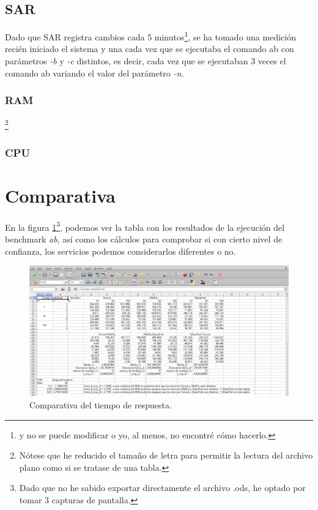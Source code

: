 \documentclass[a4paper, 10pt]{article}
\begin{document}
	\subsection{SAR}
		Dado que SAR registra cambios cada 5 minutos\footnote{y no se puede modificar o yo, al menos,
		no encontré cómo hacerlo.}, se ha tomado una medición recién iniciado el sistema y una cada
		vez que se ejecutaba el comando ab con parámetros \textit{-b} y \textit{-c} distintos, es decir,
		cada vez que se ejecutaban 3 veces el comando ab variando el valor del parámetro \textit{-n}.
	
		\subsubsection{RAM}\footnote{Nótese que he reducido el tamaño de letra para permitir la lectura
		del archivo plano como si se tratase de una tabla.}
			\lstset{basicstyle=\scriptsize}
			
	
		\subsubsection{CPU}
			\lstset{basicstyle=\footnotesize}
			


\section{Comparativa}
	En la figura \ref{fig:Comp_t}\footnote{Dado que no he sabido exportar directamente el archivo .ods,
	he optado por tomar 3 capturas de pantalla.}, podemos ver la tabla con los resultados de la ejecución
	del benchmark \textit{ab}, así como los cálculos para comprobar si con cierto nivel de confianza,
	los servicios podemos considerarlos diferentes o no.
	
	\label{sec: Comparativa}
	\begin{figure}[h!]
		\includegraphics[width=15cm]{Comparativa_tiempo.png}
		\caption{Comparativa del tiempo de respuesta.}
		\label{fig:Comp_t}
	\end{figure}
	
\end{document}
